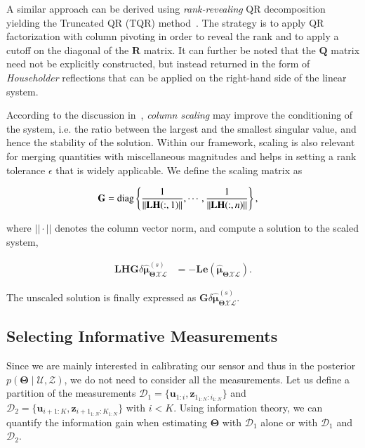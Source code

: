 A similar approach can be derived using \emph{rank-revealing} QR
decomposition~\cite{hong92rank} yielding the Truncated QR (TQR)
method~\cite{kitagawa01regularization}. The strategy is to apply QR
factorization with column pivoting in order to reveal the rank and to apply a
cutoff on the diagonal of the $\mathbf{R}$ matrix. It can further be noted that
the $\mathbf{Q}$ matrix need not be explicitly constructed, but instead returned
in the form of \emph{Householder} reflections that can be applied on the
right-hand side of the linear system.

According to the discussion in~\cite{golub96matrix}, \emph{column scaling} may
improve the conditioning of the system, i.e. the ratio between the largest and
the smallest singular value, and hence the stability of the solution. Within our
framework, scaling is also relevant for merging quantities with miscellaneous
magnitudes and helps in setting a rank tolerance $\epsilon$ that is widely
applicable. We define the scaling matrix as

\begin{equation}\label{eqn:scaling_matrix}
  \begin{aligned}
  \mathbf{G} &= \operatorname{diag}\left\{\frac{1}{||\mathbf{L}\mathbf{H}(:,1)||},\cdots,
    \frac{1}{||\mathbf{L}\mathbf{H}(:,n)||}\right\},
  \end{aligned}
\end{equation}

\noindent where $||\cdot||$ denotes the column vector norm, and compute a
solution to the scaled system,

\begin{equation}\label{eqn:scaled_system}
  \begin{aligned}
  \mathbf{L}\mathbf{H}\mathbf{G}
  \delta\hat{\boldsymbol{\mu}}_{\boldsymbol{\Theta}\mathcal{X}\mathcal{L}}^{(s)}
  &=
  -\mathbf{L}\mathbf{e}(\mathbf{\hat{\boldsymbol{\mu}}_{
  \boldsymbol{\Theta}\mathcal{X}\mathcal{L}}}).
  \end{aligned}
\end{equation}

\noindent The unscaled solution is finally expressed as $\mathbf{G}
\delta\hat{\boldsymbol{\mu}}_{\boldsymbol{\Theta}\mathcal{X}\mathcal{L}}^{(s)}$.

\subsection{Selecting Informative Measurements}

Since we are mainly interested in calibrating our sensor and thus in the
posterior $p(\boldsymbol{\Theta}\mid\mathcal{U},\mathcal{Z})$, we do not need
to consider all the measurements. Let us define a partition of the measurements
$\mathcal{D}_1=\{\mathbf{u}_{1:i}, \mathbf{z}_{1_{1:N}:i_{1:N}}\}$ and
$\mathcal{D}_2=\{\mathbf{u}_{i+1:K}, \mathbf{z}_{i+1_{1:N}:K_{1:N}}\}$ with
$i<K$. Using information theory, we can quantify the information gain when
estimating $\boldsymbol{\Theta}$ with $\mathcal{D}_1$ alone or with
$\mathcal{D}_1$ and $\mathcal{D}_2$.

